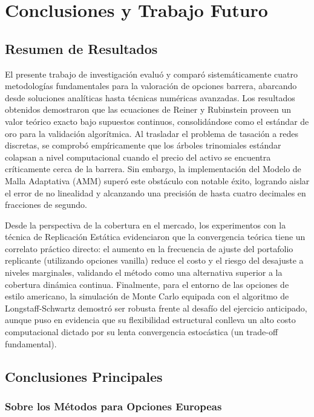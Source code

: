 \chapter{Conclusiones y Trabajo Futuro}
\label{chapter:conclusiones}

\section{Resumen de Resultados}
\label{sec:resumen_resultados}

El presente trabajo de investigación evaluó y comparó sistemáticamente cuatro metodologías fundamentales para la valoración de opciones barrera, abarcando desde soluciones analíticas hasta técnicas numéricas avanzadas. Los resultados obtenidos demostraron que las ecuaciones de Reiner y Rubinstein proveen un valor teórico exacto bajo supuestos continuos, consolidándose como el estándar de oro para la validación algorítmica. Al trasladar el problema de tasación a redes discretas, se comprobó empíricamente que los árboles trinomiales estándar colapsan a nivel computacional cuando el precio del activo se encuentra críticamente cerca de la barrera. Sin embargo, la implementación del Modelo de Malla Adaptativa (AMM) superó este obstáculo con notable éxito, logrando aislar el error de no linealidad y alcanzando una precisión de hasta cuatro decimales en fracciones de segundo.

Desde la perspectiva de la cobertura en el mercado, los experimentos con la técnica de Replicación Estática evidenciaron que la convergencia teórica tiene un correlato práctico directo: el aumento en la frecuencia de ajuste del portafolio replicante (utilizando opciones vanilla) reduce el costo y el riesgo del desajuste a niveles marginales, validando el método como una alternativa superior a la cobertura dinámica continua. Finalmente, para el entorno de las opciones de estilo americano, la simulación de Monte Carlo equipada con el algoritmo de Longstaff-Schwartz demostró ser robusta frente al desafío del ejercicio anticipado, aunque puso en evidencia que su flexibilidad estructural conlleva un alto costo computacional dictado por su lenta convergencia estocástica (un trade-off fundamental).

\section{Conclusiones Principales}
\label{sec:conclusiones_principales}

\subsection{Sobre los Métodos para Opciones Europeas}

